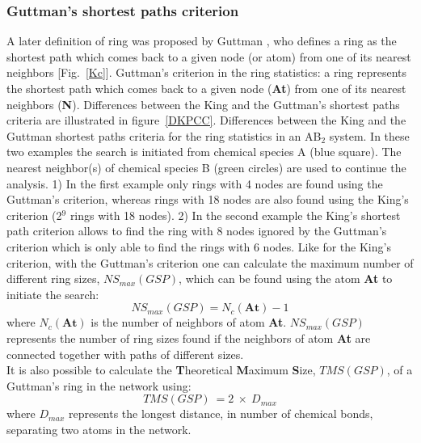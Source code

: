 \subsubsection{Guttman's shortest paths criterion}
\label{sppc}
A later definition of ring was proposed by Guttman \cite{Guttman-116-145}, who defines a ring as the shortest path which comes back to a given node (or atom) from one of its nearest neighbors [Fig.~\ref{Kc}].
{Guttman's criterion in the ring statistics: a ring represents the shortest path which comes back to a given node ({\bf{At}}) from one of its nearest neighbors ({\bf{N}}).}
\laf Differences between the King and the Guttman's shortest paths criteria are illustrated in figure~\ref{DKPCC}. 
{Differences between the King and the Guttman shortest paths criteria for the ring statistics in an AB$_2$ system. 
In these two examples the search is initiated from chemical species A (blue square). 
The nearest neighbor(s) of chemical species B (green circles) are used to continue the analysis. 
1) In the first example only rings with 4 nodes are found using the Guttman's criterion, whereas rings with 18 nodes are also found using the King's criterion (2$^9$ rings with 18 nodes). 
2) In the second example the King's shortest path criterion allows to find the ring with 8 nodes ignored by the Guttman's criterion which is only able to find the rings with 6 nodes.}
\laf Like for the King's criterion, with the Guttman's criterion one can calculate the maximum number of different ring sizes, $NS_{max}(GSP)$, which can be found using the atom {\bf{At}} to initiate the search:
\begin{equation} 
NS_{max}(GSP) = N_c({\textbf{At}}) - 1
\end{equation}
where $ N_c({\textbf{At}})$ is the number of neighbors of atom {\bf{At}}. 
$NS_{max}(GSP)$ represents the number of ring sizes found if the neighbors of atom {\bf{At}} are connected together with paths of different sizes. \\
It is also possible to calculate the {\bf{T}}heoretical {\bf{M}}aximum {\bf{S}}ize, $TMS(GSP)$, of a Guttman's ring in the network using:
\begin{equation}
\label{tmsg}
TMS(GSP)\ = 2\ \times\ D_{max}
\end{equation}
where $D_{max}$ represents the longest distance, in number of chemical bonds, separating two atoms in the network. 
